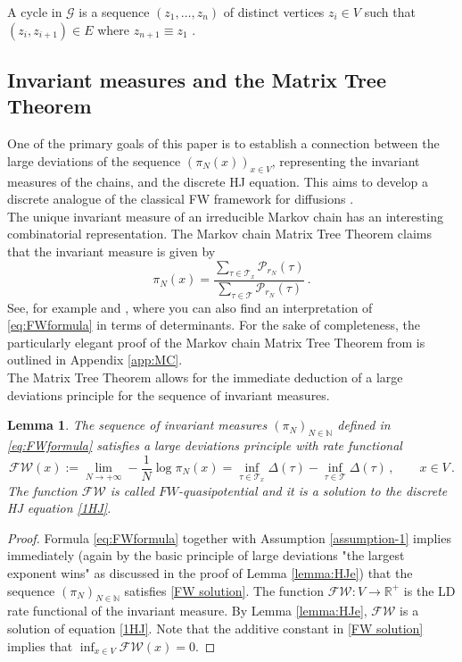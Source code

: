 \documentclass[reqno]{amsart}
\theoremstyle{plain}
\newtheorem{lemma}[theorem]{Lemma}
\theoremstyle{definition}
\theoremstyle{remark}
\numberwithin{equation}{section}
\numberwithin{theorem}{section}
\newcommand{\<}{\langle}
\renewcommand{\>}{\rangle}
\begin{document}
\smallskip
A cycle in $\mathcal{G}$ is a sequence $(z_1, \dots , z_n)$ of distinct vertices $z_i\in V$ such that $(z_i,z_{i+1})\in E$ where $z_{n+1}\equiv z_1$ .


\subsection{Invariant measures and the Matrix Tree Theorem}
One of the primary goals of this paper is to establish a connection between the large deviations of the sequence $(\pi_N(x))_{x\in V}$, representing the invariant measures of the chains, and the discrete HJ equation. This aims to develop a discrete analogue of the classical FW framework for diffusions \cite{FW}.\\

The unique invariant measure of an irreducible Markov chain has an interesting combinatorial representation.
The Markov chain Matrix Tree Theorem claims that the invariant measure is given by
\begin{equation}\label{eq:FWformula}
	\pi_N(x)=\frac{\sum_{\tau\in \mathcal T_x}\mathcal P_{r_N}(\tau)}{\sum_{\tau\in \mathcal T}\mathcal P_{r_N}(\tau)}\,.
\end{equation}
See, for example \cite{FW} and \cite{PT}, where you can also find an interpretation of \eqref{eq:FWformula} in terms of determinants. For the sake of completeness, the particularly elegant proof of the Markov chain Matrix Tree Theorem from \cite{PT} is outlined in  Appendix \ref{app:MC}.\\		

The Matrix Tree Theorem allows for the immediate deduction of a large deviations principle for the sequence of invariant measures.

\begin{lemma}\label{FWsolemma}
	The sequence of invariant measures $(\pi_N)_{N\in \mathbb N}$ defined in \eqref{eq:FWformula} satisfies a large deviations principle with rate functional
	\begin{equation} \label{FW solution}
		\mathscr{FW}(x):=\lim_{N\to +\infty}-\frac 1N\log \pi_N(x)=\inf_{\tau\in \mathcal T_x} \Delta(\tau)-\inf_{\tau\in \mathcal T} \Delta(\tau)\,, \qquad x\in V\,.
	\end{equation}
	The function $\mathscr{FW}$ is called \emph{$FW$-quasipotential} and it is a solution to  the discrete HJ equation \eqref{1HJ}. 
\end{lemma}
\begin{proof}
	Formula \eqref{eq:FWformula} together with Assumption \ref{assumption-1} implies immediately (again by the basic principle of large deviations "the largest exponent wins" as discussed in the proof of Lemma \ref{lemma:HJe})  that the sequence $(\pi_N)_{N\in \mathbb N}$ satisfies \eqref{FW solution}. The function $\mathscr{FW}:V\to \mathbb R^+$ is the LD rate functional of the invariant measure. By Lemma \ref{lemma:HJe}, $\mathscr{FW}$ is a solution of equation \eqref{1HJ}.
	Note that the additive constant in \eqref{FW solution} implies that $\inf_{x\in V} \mathscr{FW}(x)=0$.    
\end{proof} 
\end{document}
